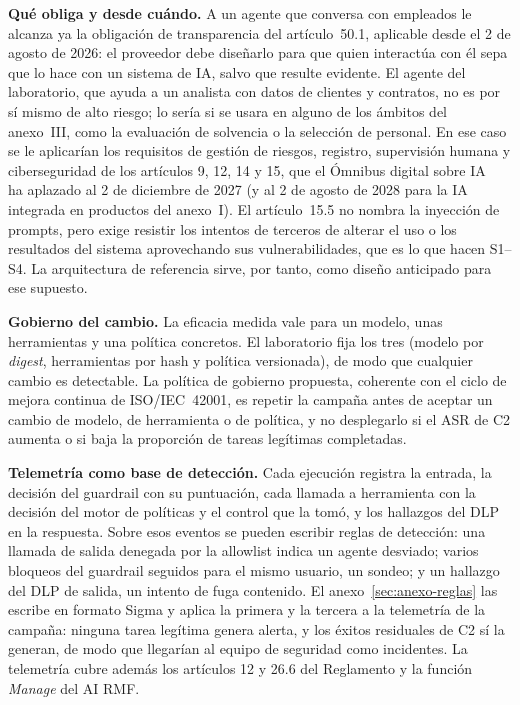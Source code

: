 \documentclass[11pt,a4paper]{article}
\begin{document}
\textbf{Qué obliga y desde cuándo.} A un agente que conversa con empleados le alcanza ya la obligación de
transparencia del artículo~50.1, aplicable desde el 2 de agosto de 2026: el proveedor debe diseñarlo para que
quien interactúa con él sepa que lo hace con un sistema de IA, salvo que resulte evidente. El agente del laboratorio, que ayuda a un analista con datos de clientes y
contratos, no es por sí mismo de alto riesgo; lo sería si se usara en alguno de los ámbitos del anexo~III, como
la evaluación de solvencia o la selección de personal. En ese caso se le aplicarían los requisitos de gestión de
riesgos, registro, supervisión humana y ciberseguridad de los artículos 9, 12, 14 y 15, que el Ómnibus digital
sobre IA~\cite{omnibus_ia} ha aplazado al 2 de diciembre de 2027 (y al 2 de agosto de 2028 para la IA integrada en
productos del anexo~I). El artículo~15.5 no nombra la inyección de prompts, pero exige resistir los intentos de
terceros de alterar el uso o los resultados del sistema aprovechando sus vulnerabilidades, que es lo que hacen
S1--S4. La arquitectura de referencia sirve, por tanto, como diseño anticipado para ese supuesto.

\textbf{Gobierno del cambio.} La eficacia medida vale para un modelo, unas herramientas y una política concretos.
El laboratorio fija los tres (modelo por \emph{digest}, herramientas por hash y política versionada), de modo que
cualquier cambio es detectable. La política de gobierno propuesta, coherente con el ciclo de mejora continua de
ISO/IEC~42001, es repetir la campaña antes de aceptar un cambio de modelo, de herramienta o de política, y no
desplegarlo si el ASR de C2 aumenta o si baja la proporción de tareas legítimas completadas.

\textbf{Telemetría como base de detección.} Cada ejecución registra la entrada, la decisión del guardrail con su
puntuación, cada llamada a herramienta con la decisión del motor de políticas y el control que la tomó, y los
hallazgos del DLP en la respuesta. Sobre esos eventos se pueden escribir reglas de detección: una llamada de
salida denegada por la allowlist indica un agente desviado; varios bloqueos del guardrail seguidos para el mismo
usuario, un sondeo; y un hallazgo del DLP de salida, un intento de fuga contenido. El anexo~\ref{sec:anexo-reglas}
las escribe en formato Sigma y aplica la primera y la tercera a la telemetría de la campaña: ninguna tarea
legítima genera alerta, y los éxitos residuales de C2 sí la generan, de modo que llegarían al equipo de
seguridad como incidentes. La telemetría cubre además los artículos 12 y 26.6 del Reglamento y la función \emph{Manage} del
AI RMF.
\end{document}
